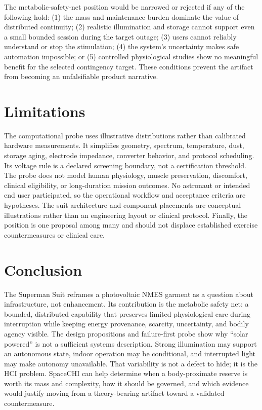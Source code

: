 \documentclass[runningheads]{llncs}
\begin{document}
The metabolic-safety-net position would be narrowed or rejected if any of the following hold: (1) the mass and maintenance burden dominate the value of distributed continuity; (2) realistic illumination and storage cannot support even a small bounded session during the target outage; (3) users cannot reliably understand or stop the stimulation; (4) the system's uncertainty makes safe automation impossible; or (5) controlled physiological studies show no meaningful benefit for the selected contingency target. These conditions prevent the artifact from becoming an unfalsifiable product narrative.

\section{Limitations}

The computational probe uses illustrative distributions rather than calibrated hardware measurements. It simplifies geometry, spectrum, temperature, dust, storage aging, electrode impedance, converter behavior, and protocol scheduling. Its voltage rule is a declared screening boundary, not a certification threshold. The probe does not model human physiology, muscle preservation, discomfort, clinical eligibility, or long-duration mission outcomes. No astronaut or intended end user participated, so the operational workflow and acceptance criteria are hypotheses. The suit architecture and component placements are conceptual illustrations rather than an engineering layout or clinical protocol. Finally, the position is one proposal among many and should not displace established exercise countermeasures or clinical care.

\section{Conclusion}

The Superman Suit reframes a photovoltaic NMES garment as a question about infrastructure, not enhancement. Its contribution is the metabolic safety net: a bounded, distributed capability that preserves limited physiological care during interruption while keeping energy provenance, scarcity, uncertainty, and bodily agency visible. The design propositions and failure-first probe show why ``solar powered'' is not a sufficient systems description. Strong illumination may support an autonomous state, indoor operation may be conditional, and interrupted light may make autonomy unavailable. That variability is not a defect to hide; it is the HCI problem. SpaceCHI can help determine when a body-proximate reserve is worth its mass and complexity, how it should be governed, and which evidence would justify moving from a theory-bearing artifact toward a validated countermeasure.
\end{document}
